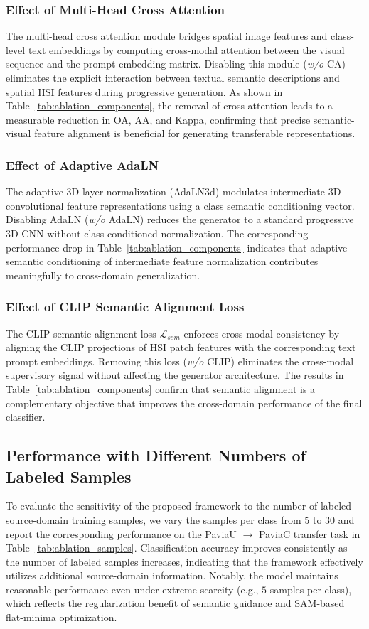 \subsubsection{Effect of Multi-Head Cross Attention}
The multi-head cross attention module bridges spatial image features and class-level text embeddings by computing cross-modal attention between the visual sequence and the prompt embedding matrix. Disabling this module (\textit{w/o} CA) eliminates the explicit interaction between textual semantic descriptions and spatial HSI features during progressive generation. As shown in Table~\ref{tab:ablation_components}, the removal of cross attention leads to a measurable reduction in OA, AA, and Kappa, confirming that precise semantic-visual feature alignment is beneficial for generating transferable representations.

\subsubsection{Effect of Adaptive AdaLN}
The adaptive 3D layer normalization (AdaLN3d) modulates intermediate 3D convolutional feature representations using a class semantic conditioning vector. Disabling AdaLN (\textit{w/o} AdaLN) reduces the generator to a standard progressive 3D CNN without class-conditioned normalization. The corresponding performance drop in Table~\ref{tab:ablation_components} indicates that adaptive semantic conditioning of intermediate feature normalization contributes meaningfully to cross-domain generalization.

\subsubsection{Effect of CLIP Semantic Alignment Loss}
The CLIP semantic alignment loss $\mathcal{L}_{sem}$ enforces cross-modal consistency by aligning the CLIP projections of HSI patch features with the corresponding text prompt embeddings. Removing this loss (\textit{w/o} CLIP) eliminates the cross-modal supervisory signal without affecting the generator architecture. The results in Table~\ref{tab:ablation_components} confirm that semantic alignment is a complementary objective that improves the cross-domain performance of the final classifier.

\subsection{Performance with Different Numbers of Labeled Samples}
To evaluate the sensitivity of the proposed framework to the number of labeled source-domain training samples, we vary the samples per class from $5$ to $30$ and report the corresponding performance on the PaviaU $\to$ PaviaC transfer task in Table~\ref{tab:ablation_samples}. Classification accuracy improves consistently as the number of labeled samples increases, indicating that the framework effectively utilizes additional source-domain information. Notably, the model maintains reasonable performance even under extreme scarcity (e.g., $5$ samples per class), which reflects the regularization benefit of semantic guidance and SAM-based flat-minima optimization.

